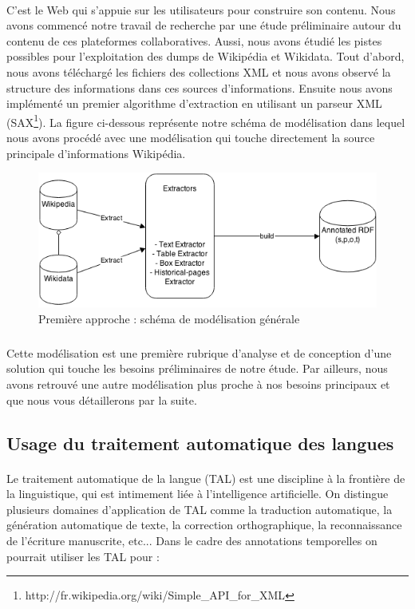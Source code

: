 \paragraph{}
C'est le Web qui s'appuie sur les utilisateurs pour construire son contenu. Nous avons commencé notre travail de recherche par une étude préliminaire autour du contenu de ces plateformes collaboratives. Aussi, nous avons étudié les pistes possibles pour l'exploitation des dumps de Wikipédia et Wikidata. Tout d'abord, nous avons téléchargé les fichiers des collections XML et nous avons observé la structure des informations dans ces sources d'informations. Ensuite nous avons implémenté un premier algorithme d'extraction en utilisant un parseur XML (SAX\footnote{http://fr.wikipedia.org/wiki/Simple\_API\_for\_XML}).
La figure ci-dessous représente notre schéma de modélisation dans lequel nous avons procédé avec une modélisation qui touche directement la source principale d'informations Wikipédia.
\begin{figure}[H]
        \centering
                \centering
                \includegraphics[width=13cm]{modelisation.png}
               \caption{Première approche : schéma de modélisation générale}

\end{figure}
\subparagraph{}
Cette modélisation est une première rubrique d'analyse et de conception d'une solution qui touche les besoins préliminaires de notre étude. Par ailleurs, nous avons retrouvé une autre modélisation plus proche à nos besoins principaux et que nous vous détaillerons par la suite.
\subsection{Usage du traitement automatique des langues}
\paragraph{}
Le traitement automatique de la langue (TAL) est une discipline à la frontière de la linguistique, qui est intimement liée à l'intelligence artificielle.
On distingue plusieurs domaines d'application de TAL comme la traduction automatique, la génération automatique de texte, la correction orthographique, la reconnaissance de l'écriture manuscrite, etc...
Dans le cadre des annotations temporelles on pourrait utiliser les TAL pour :

